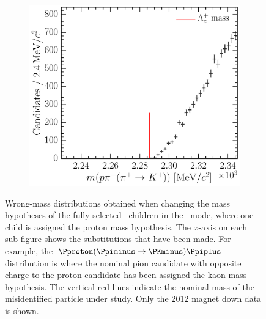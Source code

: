 \begin{figure}
\begin{subfigure}[b]{0.3\textwidth}
    \caption{\decay{\PLambdac}{\Pproton\PKminus\PKplus}}
    \label{fig:cpv:selection:background_study:ppipi_baryon:pkk}
  \end{subfigure}
  \begin{subfigure}[b]{0.3\textwidth}
    \includegraphics[width=\textwidth]{figures/cpv/selection/background_study/ppipi/LcToppipi_2012_MagDown_Lc_pp_pim_pipTokp}
    \caption{\decay{\PLambdac}{\Pproton\Ppiminus\PKplus}}
    \label{fig:cpv:selection:background_study:ppipi_baryon:ppik}
  \end{subfigure}
  \caption{%
    Wrong-mass distributions obtained when changing the mass hypotheses of the
    fully selected \PLambdac\ children in the \ppipi\ mode, where one child is
    assigned the proton mass hypothesis.
    The $x$-axis on each sub-figure shows the substitutions that have been
    made.
    For example, the ${\Pproton(\Ppiminus \to \PKminus)\Ppiplus}$ distribution is where the
    nominal pion candidate with opposite charge to the proton candidate has 
    been assigned the kaon mass hypothesis.
    The vertical red lines indicate the nominal mass of the misidentified 
    particle under study.
    Only the 2012 magnet down data is shown.
  }
  \label{fig:cpv:selection:background_study:ppipi_baryon}
\end{figure}


